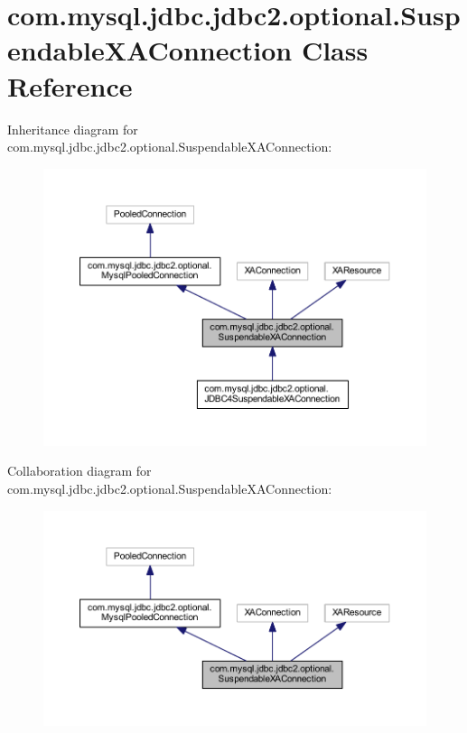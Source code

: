 \hypertarget{classcom_1_1mysql_1_1jdbc_1_1jdbc2_1_1optional_1_1_suspendable_x_a_connection}{}\section{com.\+mysql.\+jdbc.\+jdbc2.\+optional.\+Suspendable\+X\+A\+Connection Class Reference}
\label{classcom_1_1mysql_1_1jdbc_1_1jdbc2_1_1optional_1_1_suspendable_x_a_connection}


Inheritance diagram for com.\+mysql.\+jdbc.\+jdbc2.\+optional.\+Suspendable\+X\+A\+Connection\+:
\nopagebreak
\begin{figure}[H]
\begin{center}
\leavevmode
\includegraphics[width=350pt]{classcom_1_1mysql_1_1jdbc_1_1jdbc2_1_1optional_1_1_suspendable_x_a_connection__inherit__graph}
\end{center}
\end{figure}


Collaboration diagram for com.\+mysql.\+jdbc.\+jdbc2.\+optional.\+Suspendable\+X\+A\+Connection\+:
\nopagebreak
\begin{figure}[H]
\begin{center}
\leavevmode
\includegraphics[width=350pt]{classcom_1_1mysql_1_1jdbc_1_1jdbc2_1_1optional_1_1_suspendable_x_a_connection__coll__graph}
\end{center}
\end{figure}
